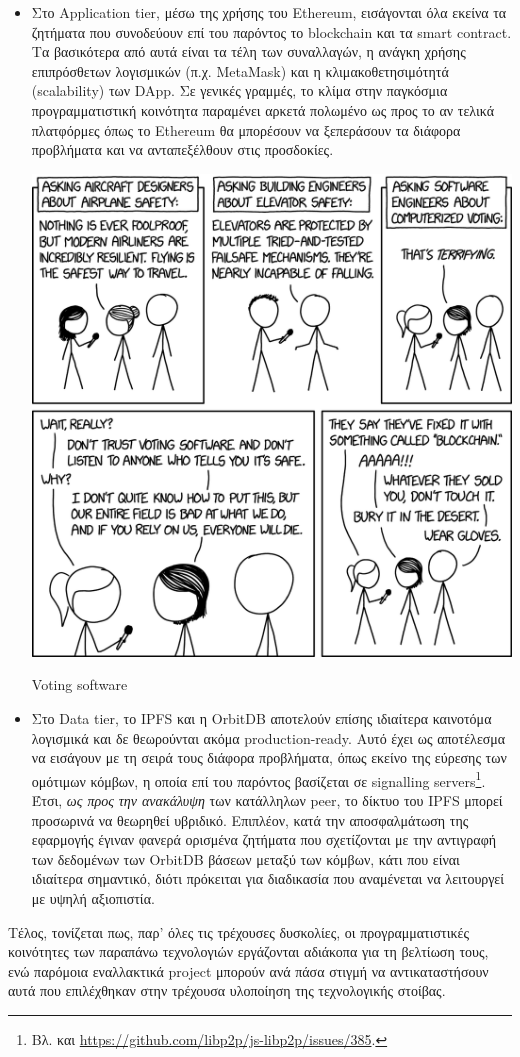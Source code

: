 \begin{itemize}
	\item Στο Application tier, μέσω της χρήσης του Ethereum, εισάγονται όλα εκείνα τα ζητήματα που συνοδεύουν επί του παρόντος το blockchain και τα smart contract. Τα βασικότερα από αυτά είναι τα τέλη των συναλλαγών, η ανάγκη χρήσης επιπρόσθετων λογισμικών (π.χ. MetaMask) και η κλιμακοθετησιμότητά (scalability) των DApp. Σε γενικές γραμμές, το κλίμα στην παγκόσμια προγραμματιστική κοινότητα παραμένει αρκετά πολωμένο ως προς το αν τελικά πλατφόρμες όπως το Ethereum θα μπορέσουν να ξεπεράσουν τα διάφορα προβλήματα και να ανταπεξέλθουν στις προσδοκίες.

	\begin{enumitemcenteredfigure}
		\includegraphics[width=.65\textwidth]{assets/figures/chapter-5/5.1.xkcd_2030_voting_software}
		\caption[Voting software]{Voting software\footnotemark}
	\end{enumitemcenteredfigure}

	\item Στο Data tier, το IPFS και η OrbitDB αποτελούν επίσης ιδιαίτερα καινοτόμα λογισμικά και δε θεωρούνται ακόμα production-ready. Αυτό έχει ως αποτέλεσμα να εισάγουν με τη σειρά τους διάφορα προβλήματα, όπως εκείνο της εύρεσης των ομότιμων κόμβων, η οποία επί του παρόντος βασίζεται σε signalling servers\footnote{Βλ. και \url{https://github.com/libp2p/js-libp2p/issues/385}.}. Έτσι, \textit{ως προς την ανακάλυψη} των κατάλληλων peer, το δίκτυο του IPFS μπορεί προσωρινά να θεωρηθεί υβριδικό. Επιπλέον, κατά την αποσφαλμάτωση της εφαρμογής έγιναν φανερά ορισμένα ζητήματα που σχετίζονται με την αντιγραφή των δεδομένων των OrbitDB βάσεων μεταξύ των κόμβων, κάτι που είναι ιδιαίτερα σημαντικό, διότι πρόκειται για διαδικασία που αναμένεται να λειτουργεί με υψηλή αξιοπιστία.
\end{itemize}

Τέλος, τονίζεται πως, παρ' όλες τις τρέχουσες δυσκολίες, οι προγραμματιστικές κοινότητες των παραπάνω τεχνολογιών εργάζονται αδιάκοπα για τη βελτίωση τους, ενώ παρόμοια εναλλακτικά project μπορούν ανά πάσα στιγμή να αντικαταστήσουν αυτά που επιλέχθηκαν στην τρέχουσα υλοποίηση της τεχνολογικής στοίβας.
